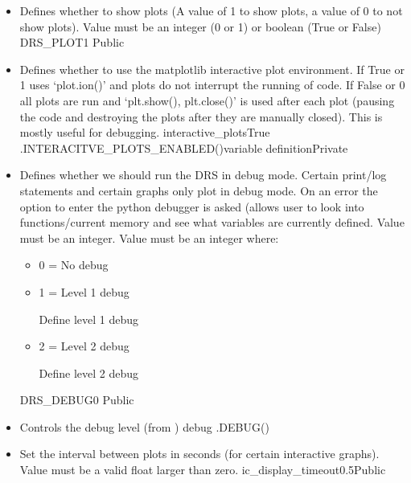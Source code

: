 \begin{itemize}
\item \label{text:drs_plot} 
{Defines whether to show plots (A value of 1 to show plots, a value of 0 to not show plots). Value must be an integer (0 or 1) or boolean (True or False)}
{DRS\_PLOT}{1}
{\AllRecipes}{\configtxtfile}{\AllRecipes}{Public}

\ifdevguide
\item {}
{Defines whether to use the matplotlib interactive plot environment. If True or 1 uses `plot.ion()' and plots do not interrupt the running of code. If False or 0 all plots are run and `plt.show(), plt.close()' is used after each plot (pausing the code and destroying the plots after they are manually closed). This is mostly useful for debugging.}
{interactive\_plots}{True}
{\spirouPlot}{\spirouConst.INTERACITVE\_PLOTS\_ENABLED()}{\spirouPlot variable definition}{Private}
\fi

\item \label{text:drs_debug} 
{Defines whether we should run the DRS in debug mode. Certain print/log statements and certain graphs only plot in debug mode. On an error the option to enter the python debugger is asked (allows user to look into functions/current memory and see what variables are currently defined. Value must be an integer. Value must be an integer where:
\begin{itemize}
\item 0 = No debug
\item 1 = Level 1 debug \begin{todo}Define level 1 debug\end{todo}
\item 2 = Level 2 debug \begin{todo}Define level 2 debug\end{todo}
\end{itemize}
}
{DRS\_DEBUG}{0}
{\AllRecipes}{\configtxtfile}{\AllRecipes}{Public}

\ifdevguide
\item {}
{Controls the debug level (from )}
{debug}
{\AllRecipes}{\spirouConst.DEBUG()}{\AllRecipes}
\fi

\item {}
{Set the interval between plots in seconds (for certain interactive graphs). Value must be a valid float larger than zero.}
{ic\_display\_timeout}{0.5}{\callocRAW}{\constantsfile}{}{Public}

\end{itemize}






